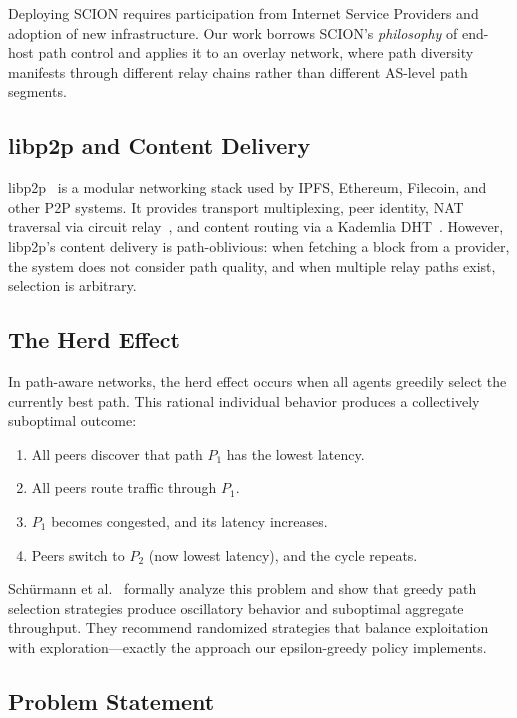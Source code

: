 \documentclass[sigconf,nonacm]{acmart}
\begin{document}
Deploying SCION requires participation from Internet Service Providers and adoption of new infrastructure. Our work borrows SCION's \emph{philosophy} of end-host path control and applies it to an overlay network, where path diversity manifests through different relay chains rather than different AS-level path segments.

\subsection{libp2p and Content Delivery}

libp2p~\cite{libp2p} is a modular networking stack used by IPFS, Ethereum, Filecoin, and other P2P systems. It provides transport multiplexing, peer identity, NAT traversal via circuit relay~\cite{circuitrelayv2}, and content routing via a Kademlia DHT~\cite{maymounkov2002kademlia}. However, libp2p's content delivery is path-oblivious: when fetching a block from a provider, the system does not consider path quality, and when multiple relay paths exist, selection is arbitrary.

\subsection{The Herd Effect}

In path-aware networks, the herd effect occurs when all agents greedily select the currently best path. This rational individual behavior produces a collectively suboptimal outcome:

\begin{enumerate}
\item All peers discover that path $P_1$ has the lowest latency.
\item All peers route traffic through $P_1$.
\item $P_1$ becomes congested, and its latency increases.
\item Peers switch to $P_2$ (now lowest latency), and the cycle repeats.
\end{enumerate}

Sch\"{u}rmann et al.~\cite{pathselection2025} formally analyze this problem and show that greedy path selection strategies produce oscillatory behavior and suboptimal aggregate throughput. They recommend randomized strategies that balance exploitation with exploration---exactly the approach our epsilon-greedy policy implements.

\subsection{Problem Statement}
\label{sec:problem}
\end{document}
